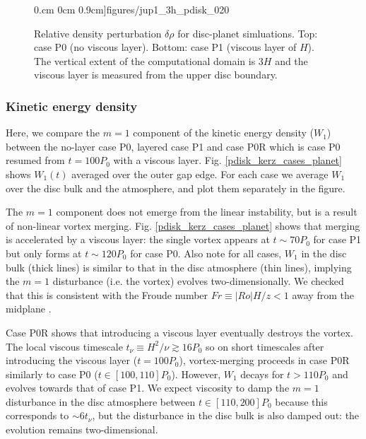 \begin{figure}
    0.cm 0cm 0.9cm]{figures/jup1_3h_pdisk_020}\\
  \caption{Relative density perturbation $\delta\rho$ for disc-planet
    simluations. Top: case P0 (no viscous layer). Bottom: case P1 (viscous layer of $H$). The
    vertical extent of the computational domain is $3H$ and the
    viscous layer is measured from the upper disc boundary.  
    \label{jup0_3h}}
\end{figure}

\subsubsection{Kinetic energy density}%
Here, we compare the $m=1$ component of the kinetic energy density
($W_1$)  between the no-layer case P0, layered
case P1 and case P0R which is case P0 resumed from $t=100P_0$ with a
viscous layer. Fig. \ref{pdisk_kerz_cases_planet} shows 
$W_1(t)$ averaged over the outer gap edge. For each case we
average $W_1$ over the disc bulk and the atmosphere, and plot them
separately in the figure. 

The $m=1$ component does not emerge from the linear instability, but is a
result of non-linear vortex merging. 
Fig. \ref{pdisk_kerz_cases_planet} shows that merging is accelerated
by a viscous layer: the single vortex appears at $t\sim70P_0$ for case
P1 but only forms at $t\sim120P_0$ for case P0. Also note for all
cases, $W_1$ in the disc bulk (thick lines) is similar to that in the
disc atmosphere (thin lines), implying the $m=1$ disturbance
(i.e. the vortex) evolves two-dimensionally. We checked that this is
consistent with the Froude number $Fr\equiv|Ro|H/z < 1 $ away from the
midplane \citep{barranco05,oishi09}. 


Case P0R shows that introducing a viscous layer eventually destroys
the vortex. The local viscous timescale $t_\nu\equiv
H^2/\nu\gtrsim 16P_0$ so on short timescales after introducing the 
viscous layer ($t=100P_0$), vortex-merging proceeds in case P0R
similarly to case P0 ($t\in[100,110]P_0$). However, $W_1$ decays for
$t>110P_0$ and evolves towards that of case P1. We expect viscosity
to damp the $m=1$ disturbance in the disc atmosphere between
$t\in[110,200]P_0$ because this corresponds to $\sim 6 t_\nu$, but 
the disturbance in the disc bulk is also damped out: the evolution
remains two-dimensional.    


